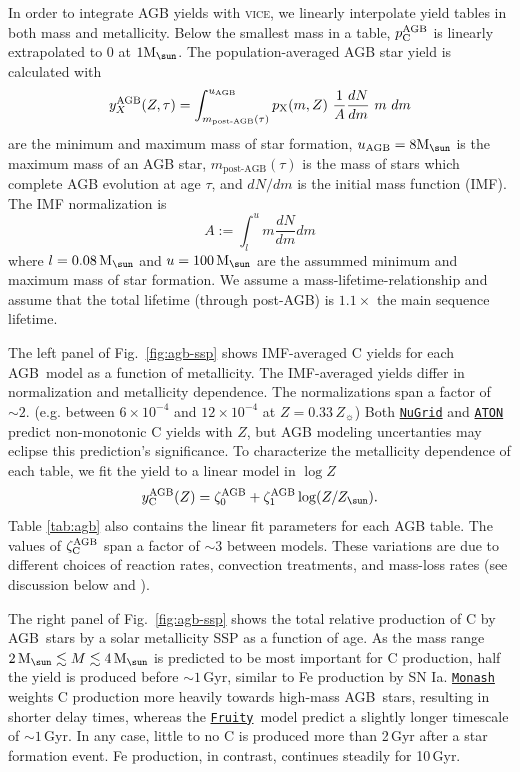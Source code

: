 \documentclass[fleqn,
usenatbib]{mnras}
\newcommand{\JJ}{\citetalias{james+21}}
\newcommand{\VICE}{\textsc{vice}}
\newcommand{\fruity}{\texttt{\hyperlink{fruity}{Fruity}}}
\newcommand{\nugrid}{\texttt{\hyperlink{nugrid}{NuGrid}}}
\newcommand{\monash}{\texttt{\hyperlink{monash}{Monash}}}
\newcommand{\aton}{\texttt{\hyperlink{aton}{ATON}}}
\newcommand{\agb}{AGB}
\newcommand{\ia}{SN Ia}
\newcommand{\ycagb}{\y_{\rm C}^{\rm AGB}}
\newcommand{\zagb}{\zeta_{\rm C}^{\rm AGB}}
\newcommand{\y}{p}
\newcommand{\zetao}{\zeta_0}
\newcommand{\zetai}{\zeta_{1}}
\newcommand{\Mo}{ {\rm M}_{\sun}}
\newcommand{\Zo}{ Z_{\sun}}
\newcommand{\about}[1]{${\sim} #1$}
\begin{document}
In order to integrate AGB yields with \VICE, we linearly interpolate yield tables in both mass and metallicity. Below the smallest mass in a table, $\ycagb$ is linearly extrapolated to 0 at $1\Mo$. The population-averaged AGB star yield is calculated with 
\begin{equation} \label{eq:imf-agb-yield}
    y_{X}^{\rm AGB}(Z,\tau) = 
    \int^{u_{\rm AGB}}_{m_\textrm{post-AGB}(\tau)} 
    \y_{\rm X}(m, Z)\ 
    \frac{1}{A}\frac{dN}{dm}\ m\ dm
\end{equation}
are the minimum and maximum mass of star formation, $u_{\rm AGB}=8\Mo$ is the maximum mass of an AGB star, $m_\textrm{post-AGB}(\tau)$ is the mass of stars which complete AGB evolution at age $\tau$, and $dN/dm$ is the initial mass function (IMF). The IMF normalization is
\begin{equation} \label{eq:imf_normalization}
    A := \int_l^u m \frac{dN}{dm} dm
\end{equation}
    where  $l=0.08\,\Mo$ and $u = 100\,\Mo$ are the assummed minimum and maximum mass of star formation. We assume a \citet{larson74} mass-lifetime-relationship and assume that the total lifetime (through post-AGB) is $1.1\times$ the main sequence lifetime.


The left panel of Fig.~\ref{fig:agb-ssp} shows IMF-averaged C yields for each \agb\ model as a function of metallicity.
The IMF-averaged yields differ in normalization and metallicity dependence.  
The normalizations span a factor of \about{2}. (e.g. between $6\times 10^{-4}$ and $12 \times 10^{-4}$ at $Z=0.33\,\Zo$)
Both \nugrid{} and \aton{} predict non-monotonic C yields with $Z$, but AGB modeling uncertanties may eclipse this prediction's significance. To characterize the metallicity dependence of each table, we fit the yield to a linear model in $\log Z$
\begin{equation}\label{eq:agb_z_approx}
    y_{\rm C}^{\rm AGB}(Z) = \zetao^{\rm AGB} + \zetai^{\rm AGB} \log(Z / \Zo).
\end{equation}
Table \ref{tab:agb} also contains the linear fit parameters for each AGB table.
The values of $\zagb$ span a factor of $\sim{3}$ between models.
These variations are due to different choices of reaction rates, convection treatments, and mass-loss rates (see discussion below and \JJ). 



The right panel of Fig.~\ref{fig:agb-ssp} shows the total relative production of C by \agb\ stars by a solar metallicity SSP as a function of age.
As the mass range $2\,\Mo\lesssim M \lesssim 4\,\Mo$ is predicted to be most important for C production, half the yield is produced before \about{1}\,Gyr, similar to Fe production by \ia. 
\monash{} weights C production more heavily towards high-mass \agb\ stars, resulting in shorter delay times, whereas the \fruity\ model predict a slightly longer timescale of \about{1}\,Gyr. In any case, little to no C is produced more than 2\,Gyr after a star formation event. Fe production, in contrast, continues steadily for 10\,Gyr. 
\end{document}
